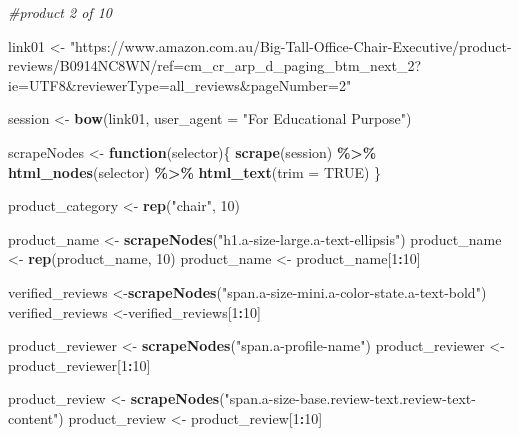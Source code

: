 \documentclass[
]{article}
\newenvironment{Shaded}{\begin{snugshade}}{\end{snugshade}}
\newcommand{\AttributeTok}[1]{\textcolor[rgb]{0.13,0.29,0.53}{#1}}
\newcommand{\CommentTok}[1]{\textcolor[rgb]{0.56,0.35,0.01}{\textit{#1}}}
\newcommand{\ConstantTok}[1]{\textcolor[rgb]{0.56,0.35,0.01}{#1}}
\newcommand{\ControlFlowTok}[1]{\textcolor[rgb]{0.13,0.29,0.53}{\textbf{#1}}}
\newcommand{\DecValTok}[1]{\textcolor[rgb]{0.00,0.00,0.81}{#1}}
\newcommand{\FunctionTok}[1]{\textcolor[rgb]{0.13,0.29,0.53}{\textbf{#1}}}
\newcommand{\NormalTok}[1]{#1}
\newcommand{\OtherTok}[1]{\textcolor[rgb]{0.56,0.35,0.01}{#1}}
\newcommand{\SpecialCharTok}[1]{\textcolor[rgb]{0.81,0.36,0.00}{\textbf{#1}}}
\newcommand{\StringTok}[1]{\textcolor[rgb]{0.31,0.60,0.02}{#1}}
\begin{document}
\begin{Shaded}
\begin{Highlighting}[]
\CommentTok{\#product 2 of 10}
  
\NormalTok{link01 }\OtherTok{\textless{}{-}} \StringTok{"https://www.amazon.com.au/Big{-}Tall{-}Office{-}Chair{-}Executive/product{-}reviews/B0914NC8WN/ref=cm\_cr\_arp\_d\_paging\_btm\_next\_2?ie=UTF8\&reviewerType=all\_reviews\&pageNumber=2"}


\NormalTok{  session }\OtherTok{\textless{}{-}} \FunctionTok{bow}\NormalTok{(link01,}
               \AttributeTok{user\_agent =} \StringTok{"For Educational Purpose"}\NormalTok{)}

\NormalTok{  scrapeNodes }\OtherTok{\textless{}{-}} \ControlFlowTok{function}\NormalTok{(selector)\{}
    \FunctionTok{scrape}\NormalTok{(session) }\SpecialCharTok{\%\textgreater{}\%}
      \FunctionTok{html\_nodes}\NormalTok{(selector) }\SpecialCharTok{\%\textgreater{}\%}
      \FunctionTok{html\_text}\NormalTok{(}\AttributeTok{trim =} \ConstantTok{TRUE}\NormalTok{)}
\NormalTok{  \}}

\NormalTok{  product\_category }\OtherTok{\textless{}{-}} \FunctionTok{rep}\NormalTok{(}\StringTok{"chair"}\NormalTok{, }\DecValTok{10}\NormalTok{)}

\NormalTok{  product\_name }\OtherTok{\textless{}{-}} \FunctionTok{scrapeNodes}\NormalTok{(}\StringTok{"h1.a{-}size{-}large.a{-}text{-}ellipsis"}\NormalTok{)}
\NormalTok{  product\_name }\OtherTok{\textless{}{-}} \FunctionTok{rep}\NormalTok{(product\_name, }\DecValTok{10}\NormalTok{)}
\NormalTok{  product\_name }\OtherTok{\textless{}{-}}\NormalTok{ product\_name[}\DecValTok{1}\SpecialCharTok{:}\DecValTok{10}\NormalTok{]}
  
\NormalTok{  verified\_reviews }\OtherTok{\textless{}{-}}\FunctionTok{scrapeNodes}\NormalTok{(}\StringTok{"span.a{-}size{-}mini.a{-}color{-}state.a{-}text{-}bold"}\NormalTok{)}
\NormalTok{  verified\_reviews }\OtherTok{\textless{}{-}}\NormalTok{verified\_reviews[}\DecValTok{1}\SpecialCharTok{:}\DecValTok{10}\NormalTok{]}
  
\NormalTok{  product\_reviewer }\OtherTok{\textless{}{-}} \FunctionTok{scrapeNodes}\NormalTok{(}\StringTok{"span.a{-}profile{-}name"}\NormalTok{)}
\NormalTok{  product\_reviewer }\OtherTok{\textless{}{-}}\NormalTok{ product\_reviewer[}\DecValTok{1}\SpecialCharTok{:}\DecValTok{10}\NormalTok{]}
  
\NormalTok{  product\_review }\OtherTok{\textless{}{-}} \FunctionTok{scrapeNodes}\NormalTok{(}\StringTok{"span.a{-}size{-}base.review{-}text.review{-}text{-}content"}\NormalTok{)}
\NormalTok{  product\_review }\OtherTok{\textless{}{-}}\NormalTok{ product\_review[}\DecValTok{1}\SpecialCharTok{:}\DecValTok{10}\NormalTok{]}
  

\end{Highlighting}
\end{Shaded}
\end{document}
